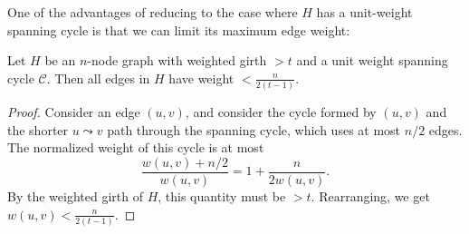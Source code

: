 \documentclass{theoretics}
\newcommand{\eps}{\varepsilon}
\newcommand{\cee}{\mathcal{C}}
\newcommand{\forward}{\texttt{forward}}
\newcommand{\backward}{\texttt{backward}}
\begin{document}
One of the advantages of reducing to the case where $H$ has a unit-weight spanning cycle is that we can limit its maximum edge weight:
\begin{lemma} \label{lem:maxwt}
Let $H$ be an $n$-node graph with weighted girth $>t$ and a unit weight spanning cycle $\cee$.
Then all edges in $H$ have weight $< \frac{n}{2(t-1)}$.
\end{lemma}
\begin{proof}
Consider an edge $(u, v)$, and consider the cycle formed by $(u, v)$ and the shorter $u \leadsto v$ path through the spanning cycle, which uses at most $n/2$ edges.
The normalized weight of this cycle is at most
$$\frac{w(u, v) + n/2}{w(u, v)} = 1 + \frac{n}{2w(u, v)}.$$
By the weighted girth of $H$, this quantity must be $>t$.
Rearranging, we get
$w(u, v) < \frac{n}{2(t-1)}$.%
\end{proof}










\end{document}
